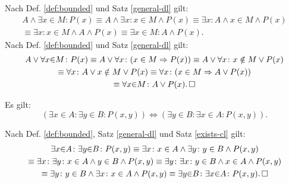 \begin{Beweis}
Nach Def. \ref{def:bounded} und Satz \ref{general-dl} gilt:
\begin{gather*}
A\land \exists x{\in}M\colon P(x)
\equiv A\land \exists x\colon x\in M\land P(x)
\equiv \exists x\colon A\land x\in M\land P(x)\\
\equiv \exists x\colon x\in M\land A\land P(x)
\equiv \exists x{\in}M\colon A\land P(x).
\end{gather*}
Nach Def. \ref{def:bounded} und Satz \ref{general-dl} gilt:
\begin{gather*}
A\lor\forall x{\in}M\colon P(x)
\equiv A\lor\forall x\colon (x\in M\Rightarrow P(x))
\equiv A\lor\forall x\colon x\notin M\lor P(x)\\
\equiv \forall x\colon A\lor x\notin M\lor P(x)
\equiv \forall x\colon (x\in M\Rightarrow A\lor P(x))\\
\equiv \forall x{\in}M\colon A\lor P(x).\,\square
\end{gather*}
\end{Beweis}

\begin{Satz}\label{bounded-exists-cl}
Es gilt:
\[(\exists x{\in}A\colon \exists y{\in}B\colon P(x,y))
\iff (\exists y{\in}B\colon \exists x{\in}A\colon P(x,y)).\]
\end{Satz}

\begin{Beweis} Nach Def. \ref{def:bounded}, Satz \ref{general-dl}
und Satz \ref{exists-cl} gilt:
\begin{gather*}
\exists x{\in}A\colon \exists y{\in}B\colon P(x,y)
\equiv \exists x\colon x\in A\land\exists y\colon y\in B\land P(x,y)\\
\equiv \exists x\colon \exists y\colon x\in A\land y\in B\land P(x,y)
\equiv \exists y\colon \exists x\colon y\in B\land x\in A\land P(x,y)\\
\equiv \exists y\colon y\in B\land \exists x\colon x\in A\land P(x,y)
\equiv \exists y{\in}B\colon\exists x{\in}A\colon P(x,y).\,\square
\end{gather*}
\end{Beweis}

